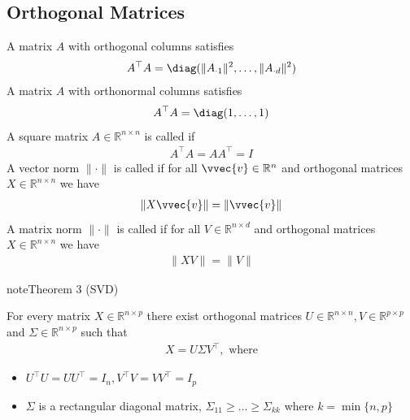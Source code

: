 \documentclass[letterpaper,10pt,english]{jupyterBook}
\begin{document}
\subsection{Orthogonal Matrices}
\label{\detokenize{linalg_normed_vs:orthogonal-matrices}}
\sphinxAtStartPar
A matrix \(A\) with orthogonal columns satisfies
\begin{align*}
    A^\top A = \diag(\lVert A_{\cdot 1}\rVert^2, \ldots, \lVert A_{\cdot d}\rVert^2)
\end{align*}
\sphinxAtStartPar
A matrix \(A\) with orthonormal columns satisfies
\begin{align*}
    A^\top A = \diag(1, \ldots, 1)
\end{align*}
\sphinxAtStartPar
A square matrix \(A\in \mathbb{R}^{n\times n}\) is called  if
\begin{equation*}
\begin{split}A^\top A = AA^\top=I\end{split}
\end{equation*}
A vector norm \(\lVert\cdot \rVert\) is called  if for all \(\vvec{v}\in\mathbb{R}^n\) and orthogonal matrices \(X\in\mathbb{R}^{n\times n}\) we have
\begin{equation*}
\begin{split}\lVert X\vvec{v}\rVert = \lVert \vvec{v}\rVert\end{split}
\end{equation*}
A matrix norm \(\lVert\cdot \rVert\) is called  if for all \(V\in\mathbb{R}^{n\times d}\) and orthogonal matrices \(X\in\mathbb{R}^{n\times n}\) we have
\begin{equation*}
\begin{split}\lVert XV\rVert = \lVert V\rVert\end{split}
\end{equation*}
\label{linalg_normed_vs:theorem-7}
\begin{sphinxadmonition}{note}{Theorem 3 (SVD)}



\sphinxAtStartPar
For every matrix \(X\in\mathbb{R}^{n\times p}\) there exist orthogonal matrices \(U\in\mathbb{R}^{n\times n}, V\in\mathbb{R}^{p\times p}\) and \(\Sigma  \in\mathbb{R}^{n\times p}\) such that
\begin{equation*}
\begin{split}X= U\Sigma V^\top, \text{ where}\end{split}
\end{equation*}
\begin{itemize}
\item {} 
\sphinxAtStartPar
\(U^\top U= UU^\top=I_n, V^\top V=VV^\top= I_p\)

\item {} 
\sphinxAtStartPar
\(\Sigma\) is a rectangular diagonal matrix, \(\Sigma_{11}\geq\ldots\geq \Sigma_{kk}\) where \(k=\min\{n,p\}\)

\end{itemize}
\end{sphinxadmonition}
\end{document}
